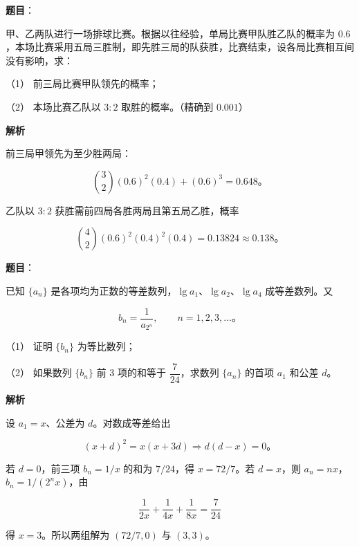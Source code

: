 \begin{answer}

\textbf{题目}：

甲、乙两队进行一场排球比赛。根据以往经验，单局比赛甲队胜乙队的概率为 $0.6$，本场比赛采用五局三胜制，即先胜三局的队获胜，比赛结束，设各局比赛相互间没有影响，求：

（1） 前三局比赛甲队领先的概率；

（2） 本场比赛乙队以 $3:2$ 取胜的概率。（精确到 $0.001$）

\textbf{解析}


前三局甲领先为至少胜两局：

\nopagebreak[4]
\[
\binom32(0.6)^2(0.4)+(0.6)^3=0.648\text{。}
\]


乙队以 $3:2$ 获胜需前四局各胜两局且第五局乙胜，概率

\nopagebreak[4]
\[
\binom42(0.6)^2(0.4)^2(0.4)=0.13824\approx0.138\text{。}
\]



\end{answer}
\begin{answer}

\textbf{题目}：

已知 $\{a_n\}$ 是各项均为正数的等差数列，$\lg a_1\text{、}\lg a_2\text{、}\lg a_4$ 成等差数列。又

\nopagebreak[4]
\[
b_n=\frac1{a_{2^n}},\qquad n=1,2,3,\ldots\text{。}
\]

（1） 证明 $\{b_n\}$ 为等比数列；

（2） 如果数列 $\{b_n\}$ 前 $3$ 项的和等于 $\dfrac7{24}$，求数列 $\{a_n\}$ 的首项 $a_1$ 和公差 $d$。

\textbf{解析}


设 $a_1=x$、公差为 $d$。对数成等差给出

\nopagebreak[4]
\[
(x+d)^2=x(x+3d)\Longrightarrow d(d-x)=0\text{。}
\]


若 $d=0$，前三项 $b_n=1/x$ 的和为 $7/24$，得 $x=72/7$。若 $d=x$，则 $a_n=nx$，$b_n=1/(2^nx)$，由

\nopagebreak[4]
\[
\frac1{2x}+\frac1{4x}+\frac1{8x}=\frac7{24}
\]

得 $x=3$。所以两组解为 $(72/7,0)$ 与 $(3,3)$。



\end{answer}
